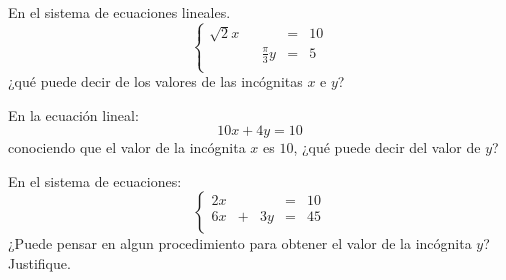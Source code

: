 \documentclass[12pt]{report}
\theoremstyle{largebreak}
\begin{document}
    \begin{excer}
        En el sistema de ecuaciones lineales.
        \begin{equation*}
            \left\{
                \begin{array}{ccccc}
                    \sqrt{2}x &  &  & = & 10 \\
                     &  & \frac{\pi}{3}y & = & 5 \\
                \end{array}
            \right.
        \end{equation*}
        ¿qué puede decir de los valores de las incógnitas $x$ e $y$?
    \end{excer}

    \begin{excer}
        En la ecuación lineal:
        \begin{equation*}
            10x+4y=10
        \end{equation*}
        conociendo que el valor de la incógnita $x$ es $10$, ¿qué puede decir del valor de $y$?
    \end{excer}

    \begin{excer}
        En el sistema de ecuaciones:
        \begin{equation*}
            \left\{
                \begin{array}{ccccc}
                    2x &  &  & = & 10 \\
                    6x & + & 3y & = & 45 \\
                \end{array}
            \right.
        \end{equation*}
        ¿Puede pensar en algun procedimiento para obtener el valor de la incógnita $y$? Justifique.
    \end{excer}
\end{document}
